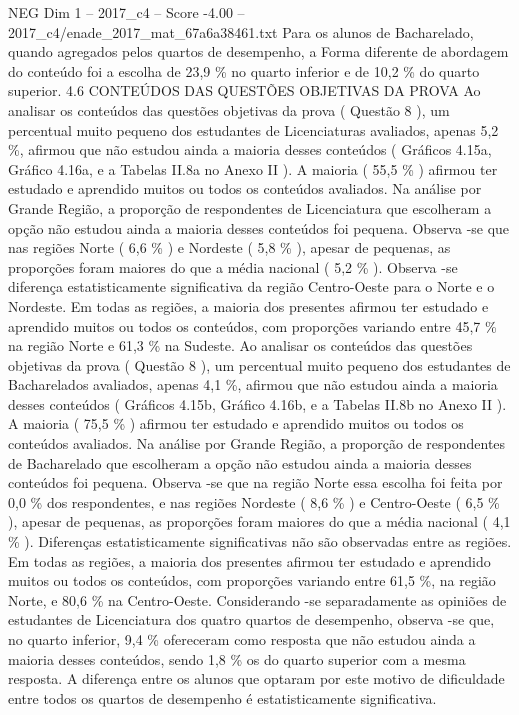 \begin{textsample}{NEG Dim 1 – 2017\_c4 – Score -4.00 – 2017\_c4/enade\_2017\_mat\_67a6a38461.txt}
Para os alunos de Bacharelado, quando agregados pelos quartos de desempenho, a Forma diferente de abordagem do conteúdo foi a escolha de 23,9 \% no quarto inferior e de 10,2 \% do quarto superior. 4.6 CONTEÚDOS DAS QUESTÕES OBJETIVAS DA PROVA Ao analisar os conteúdos das questões objetivas da prova ( Questão 8 ), um percentual muito pequeno dos estudantes de Licenciaturas avaliados, apenas 5,2 \%, afirmou que não estudou ainda a maioria desses conteúdos ( Gráficos 4.15a, Gráfico 4.16a, e a Tabelas II.8a no Anexo II ).
A maioria ( 55,5 \% ) afirmou ter estudado e aprendido muitos ou todos os conteúdos avaliados.
Na análise por Grande Região, a proporção de respondentes de Licenciatura que escolheram a opção não estudou ainda a maioria desses conteúdos foi pequena.
Observa -se que nas regiões Norte ( 6,6 \% ) e Nordeste ( 5,8 \% ), apesar de pequenas, as proporções foram maiores do que a média nacional ( 5,2 \% ).
Observa -se diferença estatisticamente significativa da região Centro-Oeste para o Norte e o Nordeste.
Em todas as regiões, a maioria dos presentes afirmou ter estudado e aprendido muitos ou todos os conteúdos, com proporções variando entre 45,7 \% na região Norte e 61,3 \% na Sudeste.
Ao analisar os conteúdos das questões objetivas da prova ( Questão 8 ), um percentual muito pequeno dos estudantes de Bacharelados avaliados, apenas 4,1 \%, afirmou que não estudou ainda a maioria desses conteúdos ( Gráficos 4.15b, Gráfico 4.16b, e a Tabelas II.8b no Anexo II ).
A maioria ( 75,5 \% ) afirmou ter estudado e aprendido muitos ou todos os conteúdos avaliados.
Na análise por Grande Região, a proporção de respondentes de Bacharelado que escolheram a opção não estudou ainda a maioria desses conteúdos foi pequena.
Observa -se que na região Norte essa escolha foi feita por 0,0 \% dos respondentes, e nas regiões Nordeste ( 8,6 \% ) e Centro-Oeste ( 6,5 \% ), apesar de pequenas, as proporções foram maiores do que a média nacional ( 4,1 \% ).
Diferenças estatisticamente significativas não são observadas entre as regiões.
Em todas as regiões, a maioria dos presentes afirmou ter estudado e aprendido muitos ou todos os conteúdos, com proporções variando entre 61,5 \%, na região Norte, e 80,6 \% na Centro-Oeste.
Considerando -se separadamente as opiniões de estudantes de Licenciatura dos quatro quartos de desempenho, observa -se que, no quarto inferior, 9,4 \% ofereceram como resposta que não estudou ainda a maioria desses conteúdos, sendo 1,8 \% os do quarto superior com a mesma resposta.
A diferença entre os alunos que optaram por este motivo de dificuldade entre todos os quartos de desempenho é estatisticamente significativa.

\end{textsample}
